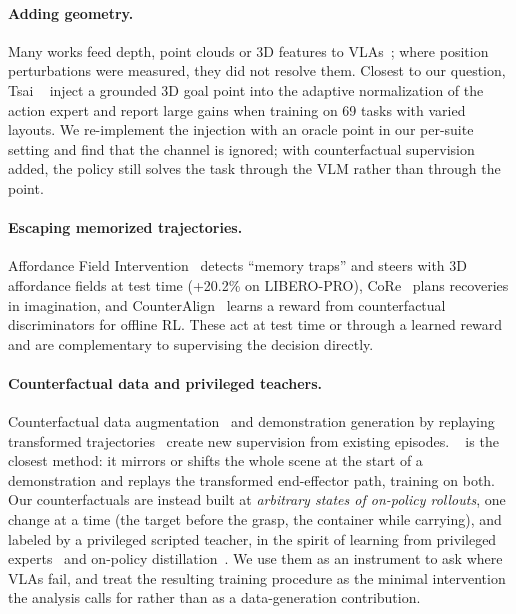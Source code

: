 \paragraph{Adding geometry.}
Many works feed depth, point clouds or 3D features to VLAs~\cite{zhen20243dvla,qu2025spatialvla}; where position
perturbations were measured, they did not resolve them.
Closest to our question, Tsai \etal~\cite{tsai2026point} inject a grounded 3D goal point into the adaptive normalization of
the action expert and report large gains when training on 69 tasks with varied layouts.
We re-implement the injection with an oracle point in our per-suite setting and find that the channel is ignored; with
counterfactual supervision added, the policy still solves the task through the VLM rather than through the point.

\paragraph{Escaping memorized trajectories.}
Affordance Field Intervention~\cite{xu2026afi} detects ``memory traps'' and steers \pizf with 3D affordance fields at test
time (+20.2\% on LIBERO-PRO), CoRe~\cite{core2026} plans recoveries in imagination, and CounterAlign~\cite{counteralign2026}
learns a reward from counterfactual discriminators for offline RL. These act at test time or through a learned reward and
are complementary to supervising the decision directly.

\paragraph{Counterfactual data and privileged teachers.}
Counterfactual data augmentation~\cite{pitis2020coda} and demonstration generation by replaying transformed
trajectories~\cite{mandlekar2023mimicgen,xue2025demogen} create new supervision from existing episodes.
\ect~\cite{chen2026ect} is the closest method: it mirrors or shifts the whole scene at the start of a demonstration and
replays the transformed end-effector path, training on both.
Our counterfactuals are instead built at \emph{arbitrary states of on-policy rollouts}, one change at a time (the target
before the grasp, the container while carrying), and labeled by a privileged scripted teacher, in the spirit of learning
from privileged experts~\cite{chen2019lbc} and on-policy distillation~\cite{ross2011dagger,agarwal2024onpolicy}.
We use them as an instrument to ask where VLAs fail, and treat the resulting training procedure as the minimal
intervention the analysis calls for rather than as a data-generation contribution.
